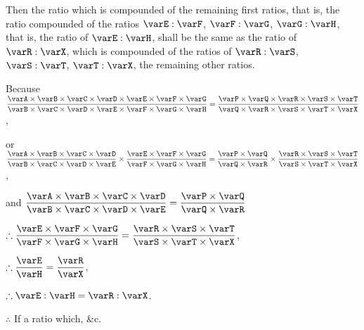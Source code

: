 \documentclass[booklanguage=english]{byrnebook}
\begin{document}
Then the ratio which is compounded of the remaining first ratios, that is, the ratio compounded of the ratios $\varE : \varF$, $\varF : \varG$, $\varG : \varH$, that is, the ratio of $\varE : \varH$, shall be the same as the ratio of $\varR : \varX$, which is compounded of the ratios of $\varR : \varS$, $\varS : \varT$, $\varT : \varX$, the remaining other ratios.

\begin{center}
Because $\dfrac
{\varA \times \varB \times \varC \times \varD \times \varE \times \varF \times \varG}
{\varB \times \varC \times \varD \times \varE \times \varF \times \varG \times \varH} =
\dfrac
{\varP \times \varQ \times \varR \times \varS \times \varT}
{\varQ \times \varR \times \varS \times \varT \times \varX}$,

or $\dfrac
{\varA \times \varB \times \varC \times \varD}
{\varB \times \varC \times \varD \times \varE}
\times
\dfrac
{\varE \times \varF \times \varG}
{\varF \times \varG \times \varH} =
\dfrac
{\varP \times \varQ}
{\varQ \times \varR}
\times
\dfrac
{\varR \times \varS \times \varT}
{\varS \times \varT \times \varX}$,

and $\dfrac
{\varA \times \varB \times \varC \times \varD}
{\varB \times \varC \times \varD \times \varE} =
\dfrac
{\varP \times \varQ}
{\varQ \times \varR}$

$\therefore \dfrac
{\varE \times \varF \times \varG}
{\varF \times \varG \times \varH} =
\dfrac
{\varR \times \varS \times \varT}
{\varS \times \varT \times \varX}$,

$\therefore \dfrac{\varE}{\varH} = \dfrac{\varR}{\varX}$,

$\therefore \varE : \varH = \varR : \varX$.

$\therefore$ If a ratio which, \&c.
\end{center}
\vfill\pagebreak
\end{document}

